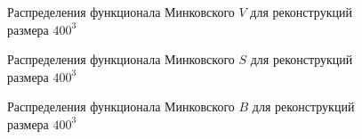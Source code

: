			\begin{figure}[h]
				\begin{minipage}[h]{0.49\linewidth}
				\end{minipage}
				\hfill
				\begin{minipage}[h]{0.49\linewidth}
				\end{minipage}
				\caption{Распределения функционала Минковского $V$ для реконструкций размера $400^3$}
				\label{5-dist-V-400}
			\end{figure}
			
			\begin{figure}[h]
				\begin{minipage}[h]{0.49\linewidth}
				\end{minipage}
				\hfill
				\begin{minipage}[h]{0.49\linewidth}
				\end{minipage}
				\caption{Распределения функционала Минковского $S$ для реконструкций размера $400^3$}
				\label{5-dist-S-400}
			\end{figure}
			
			\begin{figure}[h]
				\begin{minipage}[h]{0.49\linewidth}
				\end{minipage}
				\hfill
				\begin{minipage}[h]{0.49\linewidth}
				\end{minipage}
				\caption{Распределения функционала Минковского $B$ для реконструкций размера $400^3$}
				\label{5-dist-B-400}
			\end{figure}
			

